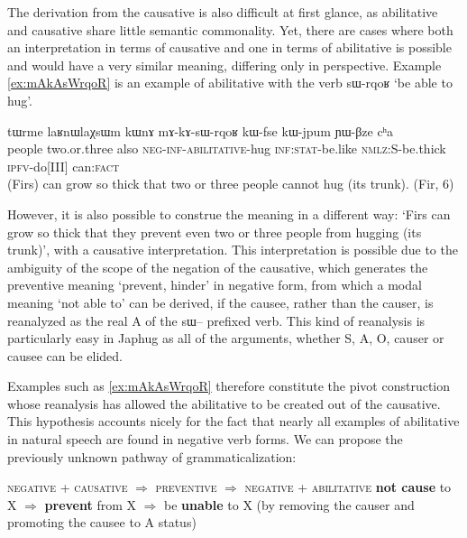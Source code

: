 \documentclass[oldfontcommands,oneside,a4paper,11pt]{article}
\newcommand{\ipa}[1]{{\phon \mbox{#1}}} %
\begin{document}
The derivation from the causative is also difficult at first glance, as abilitative and causative share little semantic commonality. Yet, there are cases where both an interpretation in terms of causative and one in terms of abilitative is possible and would have a very similar meaning, differing only in perspective. Example \ref{ex:mAkAsWrqoR} is an example of abilitative with the verb \ipa{sɯ-rqoʁ} `be able to hug'.


 \begin{exe}
\ex \label{ex:mAkAsWrqoR}
\gll
\ipa{tɯrme} 	\ipa{laʁnɯlaχsɯm} 	\ipa{kɯnɤ} 	\ipa{mɤ-kɤ-sɯ-rqoʁ} 	\ipa{kɯ-fse} 	\ipa{kɯ-jpum} 	\ipa{ɲɯ-βze} 	\ipa{cʰa} \\
people two.or.three also \textsc{neg-inf-abilitative}-hug \textsc{inf:stat}-be.like \textsc{nmlz:S}-be.thick \textsc{ipfv}-do[III] can\textsc{:fact} \\
\glt  (Firs) can grow so thick that two or three people  cannot hug (its trunk). (Fir, 6)
   \end{exe}

However, it is also possible to construe the meaning in a different way: `Firs can grow so thick that they prevent even two or three people from hugging (its trunk)', with a causative interpretation. This interpretation is possible due to the ambiguity of the scope of the negation of the causative, which generates the preventive meaning `prevent, hinder' in negative form, from which a modal meaning `not able to' can be derived, if the causee, rather than the causer, is reanalyzed as the real A of the \ipa{sɯ--} prefixed verb. This kind of reanalysis is particularly easy in Japhug as all of the arguments, whether S, A, O, causer or causee can be elided.

Examples such as \ref{ex:mAkAsWrqoR} therefore constitute the pivot construction whose reanalysis has allowed the abilitative to be created out of the causative. This hypothesis accounts nicely for the fact that nearly all examples of abilitative in natural speech are found in negative verb forms. We can propose the previously unknown pathway of grammaticalization:

{\small
\begin{exe}
\ex \label{ex:pathway2}
\glt \textsc{negative}   + \textsc{causative} $\Rightarrow$ \textsc{preventive} $\Rightarrow$ \textsc{negative} +  \textsc{abilitative} 
\glt \textbf{not cause} to X $\Rightarrow$ \textbf{prevent} from X $\Rightarrow$ be \textbf{unable} to X (by removing the causer and promoting the causee to A status)
\end{exe}
}
\end{document}
